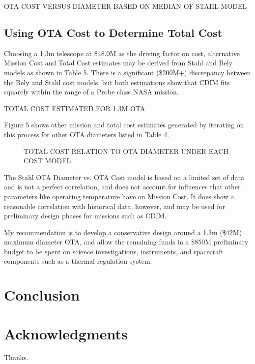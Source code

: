 \documentclass{ws-jai}
\newenvironment{notes}{\color{red}}{}
\begin{document}
\begin{notes}
\begin{table}
  \caption{OTA COST VERSUS DIAMETER BASED ON MEDIAN OF STAHL MODEL
\label{tab:cost-ota-vs-dia-CDIM}
}
\end{table}

\subsection{Using OTA Cost to Determine Total Cost}
Choosing a 1.3m telescope at \$48.0M as the driving factor on cost, alternative Mission Cost and Total Cost estimates may be derived from Stahl and Bely models as shown in Table 5.
There is a significant (\$200M+) discrepancy between the Bely and Stahl cost models, but both estimations show that CDIM fits squarely within the range of a Probe class NASA mission.

\begin{table}
  \caption{TOTAL COST ESTIMATED FOR 1.3M OTA
\label{tab:cost-tota-1.3m}
}
\end{table}

Figure 5 shows other mission and total cost estimates generated by iterating on this process for other OTA diameters listed in Table 4.

\begin{figure}
  \caption{TOTAL COST RELATION TO OTA DIAMETER UNDER EACH COST MODEL
\label{fig:cost-total-compare-models}
}
\end{figure}

The Stahl OTA Diameter vs. OTA Cost model is based on a limited set of data and is not a perfect correlation, and does not account for influences that other parameters like operating temperature have on Mission Cost.
It does show a reasonable correlation with historical data, however, and may be used for preliminary design phases for missions such as CDIM.\@

My recommendation is to develop a conservative design around a 1.3m (\$42M) maximum diameter OTA, and allow the remaining funds in a \$850M preliminary budget to be spent on science investigations, instruments, and spacecraft components such as a thermal regulation system.
\end{notes}
\section{Conclusion}
\label{sec:conclusion}
\section*{Acknowledgments}
Thanks.


\end{document}
